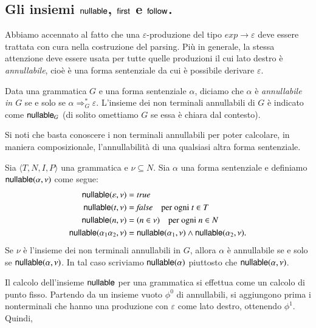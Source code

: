\subsection{Gli insiemi $\mathsf{nullable}$, $\mathsf{first}$ e $\mathsf{follow}$.}
  \label{subsec:sets}
%
Abbiamo accennato al fatto che una $\varepsilon$-produzione del tipo
$\mathit{exp}\to\varepsilon$ deve essere
trattata con cura nella costruzione del parsing. Pi\`u in generale, la stessa
attenzione deve essere usata per tutte quelle produzioni il cui lato
destro \`e \emph{annullabile}, cio\`e \`e una forma sentenziale
da cui \`e possibile derivare $\varepsilon$.
%
\begin{definition}\label{def:nullable}
Data una grammatica $G$ e una forma sentenziale $\alpha$, diciamo che
$\alpha$ \`e \emph{annullabile in $G$} se e solo se
$\alpha\Rightarrow^*_G\varepsilon$.
L'insieme dei non terminali annullabili di $G$ \`e indicato come
$\mathsf{nullable}_G$ (di solito omettiamo $G$ se essa \`e chiara dal contesto).
\end{definition}
%
\noindent
Si noti che basta conoscere i non terminali annullabili per poter calcolare,
in maniera composizionale,
l'annullabilit\`a di una qualsiasi altra forma sentenziale.
%
\begin{proposition}\label{prop:extend_nullable}
Sia $\langle T,N,I,P\rangle$ una grammatica e $\nu\subseteq N$.
Sia $\alpha$ una forma sentenziale e definiamo $\mathsf{nullable}(\alpha,\nu)$ come
segue:
\begin{equation}\label{eq:nullable}
\begin{split}
  \mathsf{nullable}(\varepsilon,\nu)&=\mathit{true}\\
  \mathsf{nullable}(t,\nu)&=\mathit{false}\quad\text{per ogni $t\in T$}\\
  \mathsf{nullable}(n,\nu)&=(n\in\nu)\quad\text{per ogni $n\in N$}\\
  \mathsf{nullable}(\alpha_1\alpha_2,\nu)&=\mathsf{nullable}(\alpha_1,\nu)\wedge
    \mathsf{nullable}(\alpha_2,\nu).
\end{split}
\end{equation}
Se $\nu$ \`e l'insieme dei non terminali annullabili in $G$, allora
$\alpha$ \`e annullabile se e solo se $\mathsf{nullable}(\alpha,\nu)$. In tal caso
scriviamo $\mathsf{nullable}(\alpha)$ piuttosto che $\mathsf{nullable}(\alpha,\nu)$.
\end{proposition}
%
Il calcolo dell'insieme $\mathsf{nullable}$ per una grammatica si effettua
come un calcolo di punto fisso. Partendo da un insieme vuoto $\phi^0$
di annullabili, si aggiungono prima i nonterminali che hanno una produzione
con $\varepsilon$ come lato destro, ottenendo $\phi^1$. Quindi,
